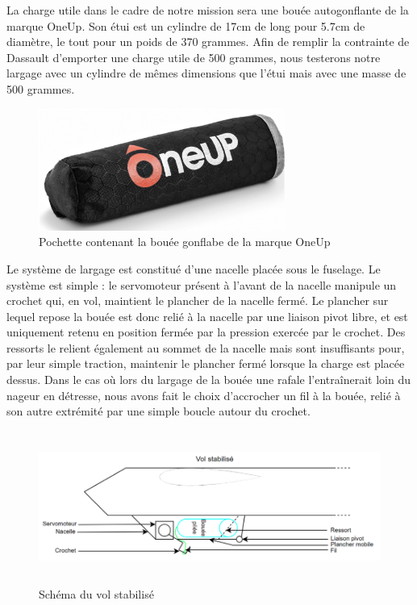 \documentclass[a4paper,12pt,french]{report}
\begin{document}
La charge utile dans le cadre de notre mission sera une bouée autogonflante de la marque OneUp. Son étui est un cylindre de 17cm de long pour 5.7cm de diamètre, le tout pour un poids de 370 grammes. Afin de remplir la contrainte de Dassault d’emporter une charge utile de 500 grammes, nous testerons notre largage avec un cylindre de mêmes dimensions que l’étui mais avec une masse de 500 grammes.

\begin{figure}[h]
    \centering
    \includegraphics[height=4cm]{figures/bouee.png}
    \caption{Pochette contenant la bouée gonflabe de la marque OneUp}
\end{figure}

Le système de largage est constitué d’une nacelle placée sous le fuselage. Le système est simple : le servomoteur présent à l’avant de la nacelle manipule un crochet qui, en vol, maintient le plancher de la nacelle fermé. Le plancher sur lequel repose la bouée est donc relié à la nacelle par une liaison pivot libre, et est uniquement retenu en position fermée par la pression exercée par le crochet. Des ressorts le relient également au sommet de la nacelle mais sont insuffisants pour, par leur simple traction, maintenir le plancher fermé lorsque la charge est placée dessus. Dans le cas où lors du largage de la bouée une rafale l’entraînerait loin du nageur en détresse, nous avons fait le choix d’accrocher un fil à la bouée, relié à son autre extrémité par une simple boucle autour du crochet.\newline

\begin{figure}[h]
    \centering
    \includegraphics[height=5cm]{figures/b1.png}
    \caption{Schéma du vol stabilisé}
\end{figure}
\end{document}
